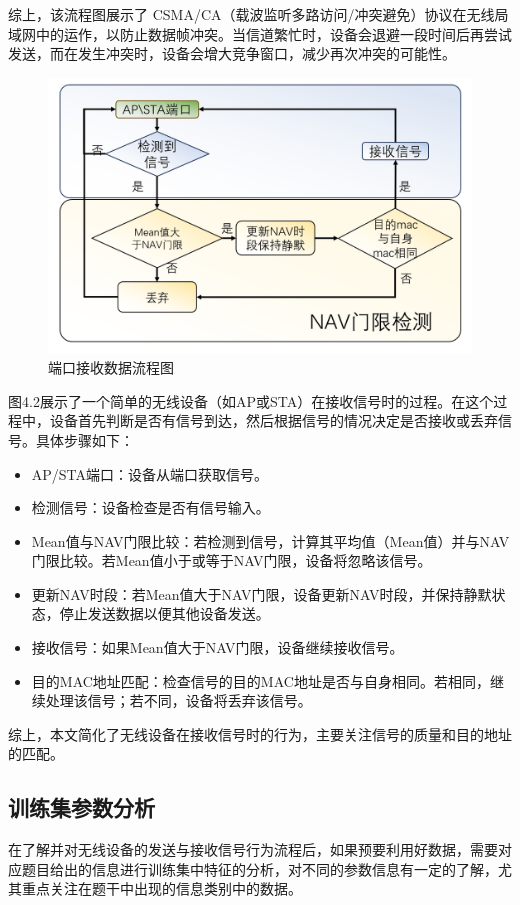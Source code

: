 综上，该流程图展示了 CSMA/CA（载波监听多路访问/冲突避免）协议在无线局域网中的运作，以防止数据帧冲突。当信道繁忙时，设备会退避一段时间后再尝试发送，而在发生冲突时，设备会增大竞争窗口，减少再次冲突的可能性。

\begin{figure}[H]
	\centering
	\includegraphics[width=0.7\linewidth]{figures/4.2}
	\caption{端口接收数据流程图}
	\label{fig:端口接收数据流程图}
\end{figure}

图4.2展示了一个简单的无线设备（如AP或STA）在接收信号时的过程。在这个过程中，设备首先判断是否有信号到达，然后根据信号的情况决定是否接收或丢弃信号。具体步骤如下：

\begin{itemize}
	\item AP/STA端口：设备从端口获取信号。
	\item 检测信号：设备检查是否有信号输入。
	\item Mean值与NAV门限比较：若检测到信号，计算其平均值（Mean值）并与NAV门限比较。若Mean值小于或等于NAV门限，设备将忽略该信号。
	\item 更新NAV时段：若Mean值大于NAV门限，设备更新NAV时段，并保持静默状态，停止发送数据以便其他设备发送。
	\item 接收信号：如果Mean值大于NAV门限，设备继续接收信号。
	\item 目的MAC地址匹配：检查信号的目的MAC地址是否与自身相同。若相同，继续处理该信号；若不同，设备将丢弃该信号。
\end{itemize}

综上，本文简化了无线设备在接收信号时的行为，主要关注信号的质量和目的地址的匹配。


\subsection{训练集参数分析}

在了解并对无线设备的发送与接收信号行为流程后，如果预要利用好数据，需要对应题目给出的信息进行训练集中特征的分析，对不同的参数信息有一定的了解，尤其重点关注在题干中出现的信息类别中的数据。


